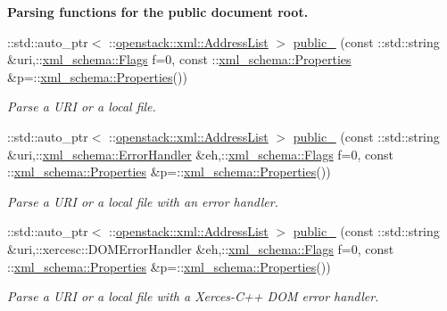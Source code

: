 \begin{Indent}{\bf Parsing functions for the public document root.}\par
\begin{DoxyCompactItemize}
\item 
::std::auto\_\-ptr$<$ ::\hyperlink{classopenstack_1_1xml_1_1AddressList}{openstack::xml::AddressList} $>$ \hyperlink{namespaceopenstack_1_1xml_aa3f3be2cf3e9350604d3aa9e7f28a220}{public\_\-} (const ::std::string \&uri,::\hyperlink{namespacexml__schema_affb4c227cbd9aa7453dd1dc5a1401943}{xml\_\-schema::Flags} f=0, const ::\hyperlink{namespacexml__schema_ad27ce19a7ee1d3b1064092648898f64c}{xml\_\-schema::Properties} \&p=::\hyperlink{namespacexml__schema_ad27ce19a7ee1d3b1064092648898f64c}{xml\_\-schema::Properties}())
\begin{DoxyCompactList}\small\item\em Parse a URI or a local file. \item\end{DoxyCompactList}\item 
::std::auto\_\-ptr$<$ ::\hyperlink{classopenstack_1_1xml_1_1AddressList}{openstack::xml::AddressList} $>$ \hyperlink{namespaceopenstack_1_1xml_aceba17eea3cdd0b4f2f8cbeb907ae04f}{public\_\-} (const ::std::string \&uri,::\hyperlink{namespacexml__schema_ab1c9361bfd3b404eaabf0c31eded79dc}{xml\_\-schema::ErrorHandler} \&eh,::\hyperlink{namespacexml__schema_affb4c227cbd9aa7453dd1dc5a1401943}{xml\_\-schema::Flags} f=0, const ::\hyperlink{namespacexml__schema_ad27ce19a7ee1d3b1064092648898f64c}{xml\_\-schema::Properties} \&p=::\hyperlink{namespacexml__schema_ad27ce19a7ee1d3b1064092648898f64c}{xml\_\-schema::Properties}())
\begin{DoxyCompactList}\small\item\em Parse a URI or a local file with an error handler. \item\end{DoxyCompactList}\item 
::std::auto\_\-ptr$<$ ::\hyperlink{classopenstack_1_1xml_1_1AddressList}{openstack::xml::AddressList} $>$ \hyperlink{namespaceopenstack_1_1xml_a06ad36719a7301d016425c774bf5f1da}{public\_\-} (const ::std::string \&uri,::xercesc::DOMErrorHandler \&eh,::\hyperlink{namespacexml__schema_affb4c227cbd9aa7453dd1dc5a1401943}{xml\_\-schema::Flags} f=0, const ::\hyperlink{namespacexml__schema_ad27ce19a7ee1d3b1064092648898f64c}{xml\_\-schema::Properties} \&p=::\hyperlink{namespacexml__schema_ad27ce19a7ee1d3b1064092648898f64c}{xml\_\-schema::Properties}())
\begin{DoxyCompactList}\small\item\em Parse a URI or a local file with a Xerces-\/C++ DOM error handler. \item\end{DoxyCompactList}\item 

\end{DoxyCompactItemize}
\end{Indent}
